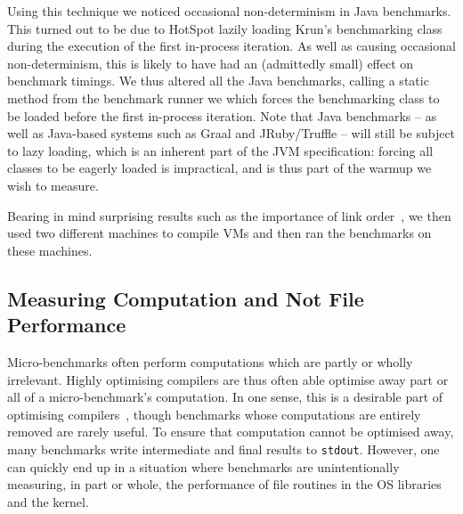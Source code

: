 \documentclass[a4paper,UKenglish]{lipics}
\newcommand{\krun}{Krun\xspace}
\begin{document}
Using this technique we noticed occasional non-determinism in Java benchmarks.
This turned out to be due to HotSpot lazily loading \krun's benchmarking class
during the execution of the first in-process iteration. As well as causing
occasional non-determinism, this is likely to have had an (admittedly small)
effect on benchmark timings. We thus altered all the Java benchmarks, calling a
static method from the benchmark runner 
we which
forces the benchmarking class to be loaded before the first in-process
iteration. Note that Java benchmarks -- as well as
Java-based systems such as Graal and JRuby/Truffle -- will still be subject to
lazy loading, which is an inherent part of the JVM specification: forcing all
classes to be eagerly loaded is impractical, and is thus part of the warmup we
wish to measure.

Bearing in mind surprising
results such as the importance of link order~\cite{mytkowicz09surprising}, we
then used two different machines to compile VMs and then ran the benchmarks
on these machines.


\subsection{Measuring Computation and Not File Performance}

Micro-benchmarks often perform computations which are partly or wholly irrelevant. Highly
optimising compilers are thus often able optimise away part or all of a
micro-benchmark's computation. In one sense, this is a desirable part of
optimising compilers~\cite{seaton15phd}, though benchmarks whose computations
are entirely removed are rarely useful. To ensure that computation cannot
be optimised away, many benchmarks write intermediate and final results
to \texttt{stdout}. However, one can quickly end up in a situation where benchmarks are
unintentionally measuring, in part or whole, the performance of file routines in
the OS libraries and the kernel.
\end{document}
